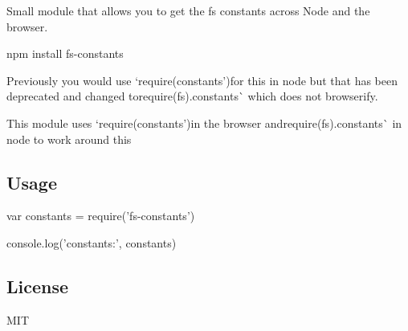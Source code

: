 Small module that allows you to get the fs constants across Node and the browser.


\begin{DoxyCode}
npm install fs-constants
\end{DoxyCode}


Previously you would use `require(\textquotesingle{}constants'){\ttfamily for this in node but that has been deprecated and changed to}require(\textquotesingle{}fs\textquotesingle{}).constants\`{} which does not browserify.

This module uses `require(\textquotesingle{}constants'){\ttfamily in the browser and}require(\textquotesingle{}fs\textquotesingle{}).constants\`{} in node to work around this

\subsection*{Usage}


\begin{DoxyCode}
var constants = require('fs-constants')

console.log('constants:', constants)
\end{DoxyCode}


\subsection*{License}

M\+IT 